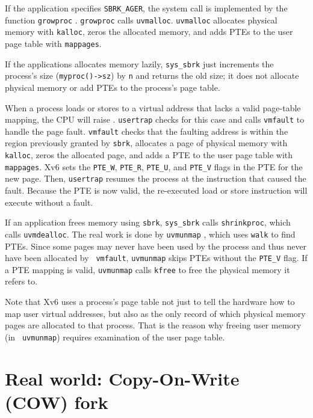 If the application specifies \lstinline{SBRK_AGER}, the system
call is implemented by the function
\lstinline{growproc}
.
\lstinline{growproc} calls \lstinline{uvmalloc}.
\lstinline{uvmalloc}
allocates physical memory with {\tt kalloc}, zeros the allocated memory,
and adds PTEs to the user page table with {\tt mappages}.

If the applications allocates memory lazily, \lstinline{sys_sbrk}
just increments the process's size
(\lstinline{myproc()->sz}) by {\tt n} and returns the old size; it does
not allocate physical memory or add PTEs to the process's page table.

When a process loads or stores to a virtual address that
lacks a valid page-table mapping, the CPU will
raise .
\lstinline{usertrap} checks for this case
and calls \lstinline{vmfault}
to handle the page fault.  \lstinline{vmfault}
checks that the faulting address is within the
region previously granted by {\tt sbrk},
allocates a page of physical memory with {\tt kalloc},
zeros the allocated page, and adds a PTE to the user page table with
{\tt mappages}.  Xv6 sets the \lstinline{PTE_W}, \lstinline{PTE_R},
\lstinline{PTE_U}, and \lstinline{PTE_V} flags in the PTE for the
new page. Then, \lstinline{usertrap} resumes the
process at the instruction that caused the fault. Because the
PTE is now valid, the re-executed load or store instruction
will execute without a fault.

If an application frees memory using {\tt sbrk}, \lstinline{sys_sbrk}
calls \lstinline{shrinkproc}, which calls \lstinline{uvmdealloc}.  The
real work is done by {\tt uvmunmap} ,
which uses {\tt walk} to find PTEs.  Since some pages may never have
been used by the process and thus never have been allocated by {\tt
  vmfault}, {\tt uvmunmap} skips PTEs without the \lstinline{PTE_V}
flag.  If a PTE mapping is valid, {\tt uvmunmap} calls {\tt kfree}
to free the physical memory it refers to.

Note that Xv6 uses a process's page table not just to tell the
hardware how to map user virtual addresses, but also as the only
record of which physical memory pages are allocated to that
process. That is the reason why freeing user memory (in {\tt
  uvmunmap}) requires examination of the user page table.

\section{Real world: Copy-On-Write (COW) fork}

